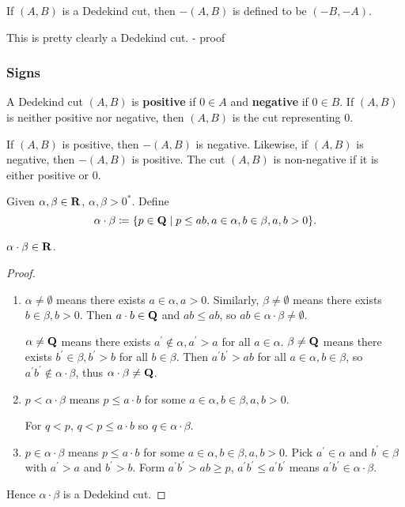 If $(A,B)$ is a Dedekind cut, then $-(A,B)$ is defined to be
$(-B,-A)$.

This is pretty clearly a Dedekind cut. - proof

\subsubsection{Signs}
A Dedekind cut $(A,B)$ is \textbf{positive} if $0 \in A$ and \textbf{negative} if $0 \in B$. If $(A,B)$ is neither positive nor negative, then $(A,B)$ is the cut representing 0.

If $(A,B)$ is positive, then $-(A,B)$ is negative. Likewise, if $(A,B)$ is negative, then $-(A,B)$ is positive. The cut $(A,B)$ is non-negative if it is either positive or 0.




\begin{definition}[Multiplication on $\RR$]
Given $\alpha,\beta\in\mathbf R$, $\alpha,\beta>0^*$. Define
\[\alpha\cdot\beta\coloneqq\{p\in\mathbf Q\mid p\le ab,a\in\alpha,b\in\beta,a,b>0\}.\]
\end{definition}

\begin{proposition}
$\alpha\cdot\beta\in\mathbf R$.
\end{proposition}

\begin{proof} \
\begin{enumerate}[label=(\arabic*)]
\item $\alpha\neq\emptyset$ means there exists $a\in\alpha,a>0$. Similarly, $\beta\neq\emptyset$ means there exists $b\in\beta,b>0$. Then $a\cdot b\in\mathbf Q$ and $ab\le ab$, so $ab\in\alpha\cdot\beta\neq\emptyset$.

$\alpha\neq\mathbf Q$ means there exists $a^\prime\notin\alpha,a^\prime>a$ for all $a\in\alpha$. $\beta\neq\mathbf Q$ means there exists $b^\prime\in\beta,b^\prime>b$ for all $b\in\beta$. Then $a^\prime b^\prime>ab$ for all $a\in\alpha,b\in\beta$, so $a^\prime b^\prime\notin\alpha\cdot\beta$, thus $\alpha\cdot\beta\neq\mathbf Q$.

\item $p<\alpha\cdot\beta$ means $p\le a\cdot b$ for some $a\in\alpha,b\in\beta,a,b>0$.

For $q<p$, $q<p\le a\cdot b$ so $q\in\alpha\cdot\beta$.

\item $p\in\alpha\cdot\beta$ means $p\le a\cdot b$ for some $a\in\alpha,b\in\beta,a,b>0$. Pick $a^\prime\in\alpha$ and $b^\prime\in\beta$ with $a^\prime>a$ and $b^\prime>b$. Form $a^\prime b^\prime>ab\ge p$, $a^\prime b^\prime\le a^\prime b^\prime$ means $a^\prime b^\prime\in\alpha\cdot\beta$.
\end{enumerate}
Hence $\alpha\cdot\beta$ is a Dedekind cut.
\end{proof}
\pagebreak

